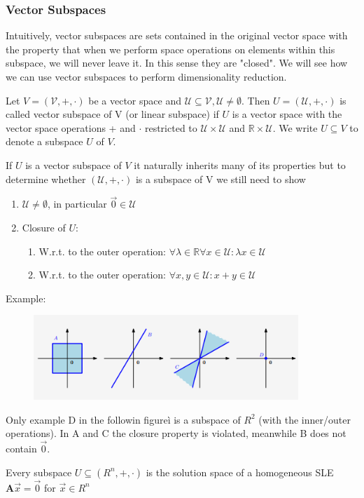 \subsubsection*{Vector Subspaces}
Intuitively, vector subspaces are sets contained in the original vector space with the property that when we perform space operations on elements within this subspace, we will never leave it. In this sense they are "closed". We will see how we can use vector subspaces to perform dimensionality reduction.
\begin{definition}
    Let $V = (\mathcal{V}, +, \cdot)$ be a vector space and $\mathcal{U} \subseteq \mathcal{V}, \mathcal{U} \neq \emptyset$. Then $U = (\mathcal{U},+,\cdot)$ is called vector subspace of V (or linear subspace) if $U$ is a vector space with the vector space operations + and $\cdot$ restricted to $\mathcal{U} \times \mathcal{U}$ and $\mathbb{R} \times \mathcal{U}$. We write $U \subseteq V$ to denote a subspace $U$ of $V$.
\end{definition}
If $U$ is a vector subspace of $V$ it naturally inherits many of its properties but to determine whether $(\mathcal{U}, +, \cdot)$ is a subspace of V we still need to show
\begin{enumerate}
    \item $\mathcal{U} \neq \emptyset$, in particular $\vec{0} \in \mathcal{U}$
    \item Closure of $U$:
    \begin{enumerate}
        \item W.r.t. to the outer operation: $\forall \lambda \in \mathbb{R} \forall x \in \mathcal{U}: \lambda x \in \mathcal{U}$
        \item W.r.t. to the outer operation: $\forall x,y \in \mathcal{U}: x + y \in \mathcal{U}$
    \end{enumerate}
\end{enumerate}
Example:
\begin{figure}[htbp]
    \centering
    \includegraphics[width=10cm]{Mathematical Background/example-subspace-recognition.png}
\end{figure}
Only example D in the followin figureì is a subspace of $R^2$ (with the inner/outer operations). In A and C the closure property is violated, meanwhile B does not contain $\vec{0}$.
\begin{remark}
    Every subspace $U \subseteq (R^n, + ,\cdot)$ is the solution space of a homogeneous SLE $\mathbf{A}\vec{x} = \vec{0}$ for $\vec{x} \in R^n$
\end{remark}
